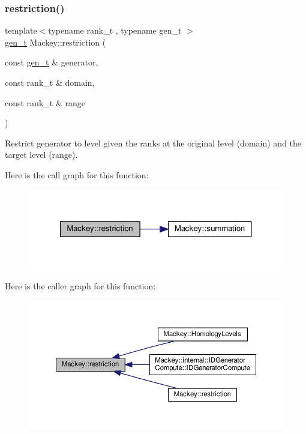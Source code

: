 \mbox{\label{namespaceMackey_ad1e907ff76b07d4fc4c9d4bdf25918bd}} 
\subsubsection{\texorpdfstring{restriction()}{restriction()}\hspace{0.1cm}{\footnotesize\ttfamily [1/2]}}
{\footnotesize\ttfamily template$<$typename rank\+\_\+t , typename gen\+\_\+t $>$ \\
\hyperlink{namespaceMackey_a6bb0b2796632ba6c7f8ea192f7aecffe}{gen\+\_\+t} Mackey\+::restriction (\begin{DoxyParamCaption}\item[{const \hyperlink{namespaceMackey_a6bb0b2796632ba6c7f8ea192f7aecffe}{gen\+\_\+t} \&}]{generator,  }\item[{const rank\+\_\+t \&}]{domain,  }\item[{const rank\+\_\+t \&}]{range }\end{DoxyParamCaption})}



Restrict generator to level given the ranks at the original level (domain) and the target level (range). 

Here is the call graph for this function\+:\nopagebreak
\begin{figure}[H]
\begin{center}
\leavevmode
\includegraphics[width=321pt]{namespaceMackey_ad1e907ff76b07d4fc4c9d4bdf25918bd_cgraph}
\end{center}
\end{figure}
Here is the caller graph for this function\+:\nopagebreak
\begin{figure}[H]
\begin{center}
\leavevmode
\includegraphics[width=350pt]{namespaceMackey_ad1e907ff76b07d4fc4c9d4bdf25918bd_icgraph}
\end{center}
\end{figure}
\mbox{\label{namespaceMackey_a6818760aa9590810daace862e4c71f04}} 
